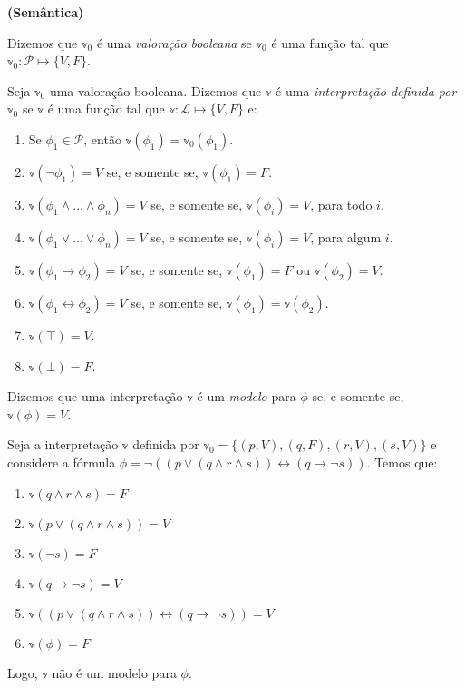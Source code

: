\begin{definition}\textbf{(Semântica)}
	
	Dizemos que $\mathbb{v}_0$ é uma \emph{valoração booleana} se $\mathbb{v}_0$ é uma função tal que\break $\mathbb{v}_0 : \mathcal{P} \longmapsto \{V,F\}$.
    
    Seja $\mathbb{v}_0$ uma valoração booleana. Dizemos que $\mathbb{v}$ é uma \emph{interpretação definida por $\mathbb{v}_0$} se $\mathbb{v}$ é uma função tal que $\mathbb{v} : \mathcal{L} \longmapsto \{V,F\}$ e:
    \begin{enumerate}
        \item Se $\phi_1 \in \mathcal{P}$, então $\mathbb{v}(\phi_1) = \mathbb{v}_0(\phi_1)$.
        \item $\mathbb{v}(\neg \phi_1) = V$ se, e somente se, $\mathbb{v}(\phi_1) = F$.
        \item $\mathbb{v}(\phi_1 \wedge ... \wedge \phi_n) = V$ se, e somente se, $\mathbb{v}(\phi_i) = V$, para todo $i$.
        \item $\mathbb{v}(\phi_1 \vee ... \vee \phi_n) = V$ se, e somente se, $\mathbb{v}(\phi_i) = V$, para algum $i$.
        \item $\mathbb{v}(\phi_1 \rightarrow \phi_2) = V$ se, e somente se, $\mathbb{v}(\phi_1) = F$ ou $\mathbb{v}(\phi_2) = V$.
        \item $\mathbb{v}(\phi_1 \leftrightarrow \phi_2) = V$ se, e somente se, $\mathbb{v}(\phi_1) = \mathbb{v}(\phi_2)$.
        \item $\mathbb{v}(\top) = V$.
        \item $\mathbb{v}(\bot) = F$.
    \end{enumerate}
    
    Dizemos que uma interpretação $\mathbb{v}$ é um \emph{modelo} para $\phi$ se, e somente se, $\mathbb{v}(\phi) = V$.
\end{definition}

\begin{example}
    Seja a interpretação $\mathbb{v}$ definida por $\mathbb{v}_0 = \{(p,V),(q,F),(r,V),(s,V)\}$ e considere a fórmula $\phi = \neg((p \vee (q \wedge r \wedge s)) \leftrightarrow (q \rightarrow \neg s))$. Temos que:
    \begin{enumerate}
        \item $\mathbb{v}(q \wedge r \wedge s) = F$
        \item $\mathbb{v}(p \vee (q \wedge r \wedge s)) = V$
        \item $\mathbb{v}(\neg s) = F$
        \item $\mathbb{v}(q \rightarrow \neg s) = V$
        \item $\mathbb{v}((p \vee (q \wedge r \wedge s)) \leftrightarrow (q \rightarrow \neg s)) = V$
        \item $\mathbb{v}(\phi) = F$
    \end{enumerate}
    Logo, $\mathbb{v}$ não é um modelo para $\phi$.
\end{example}

